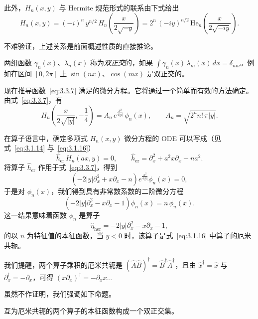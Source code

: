此外，$H_n(x,y)$ 与 Hermite 规范形式的联系由下式给出
\begin{equation}
H_n(x,y)=(-i)^n\,y^{n/2}\,
H_n\!\left(\frac{x}{2\sqrt{-y}}\right)
=2^n\,(-iy)^{n/2}\,
\mathrm{He}_n\!\left(\frac{x}{2\sqrt{-iy}}\right).
\label{eq:3.3.11}
\end{equation}

不难验证，上述关系是前面概述性质的直接推论。

 两组函数 $\gamma_n(x)$、$\lambda_n(x)$ 称为\emph{双正交}的，如果
$\int \gamma_n(x)\,\lambda_m(x)\,dx=\delta_{nm}$。例如在区间 $[0,2\pi]$ 上 $\sin(nx)$、$\cos(mx)$ 是双正交的。

\medskip
现在推导函数~\eqref{eq:3.3.7} 满足的微分方程。它将通过一个简单而有效的方法确定。由式~\eqref{eq:3.3.7}，有
\[
H_n\!\left(\frac{x}{2\sqrt{|y|}},-\frac{1}{4}\right)
=A_n\,e^{\frac{x^2}{4|y|}}\,\phi_n(x),\qquad
A_n=\sqrt{2^n n!\,\pi|y|}.
\]

在算子语言中，确定多项式 $H_n(x,y)$ 微分方程的 ODE 可以写成（见式~\eqref{eq:3.1.14} 与~\eqref{eq:3.1.16}）
\[
\hat h_{\mathrm{er}}\,H_n(ax,y)=0,\qquad
\hat h_{\mathrm{er}}=\partial_x^2+a^2x\partial_x-n a^2.
\]
将算子 $\hat h_{\mathrm{er}}$ 作用于式~\eqref{eq:3.3.7}，得到
\[
\left(-2|y|\partial_x^2+x\partial_x-n\right)e^{\frac{x^2}{4|y|}}\phi_n(x)=0,
\]
于是对 $\phi_n(x)$，我们得到具有非常数系数的二阶微分方程
\begin{equation}
\left(-2|y|\partial_x^2-x\partial_x-1\right)\phi_n(x)=n\,\phi_n(x).
\label{eq:3.3.15}
\end{equation}
这一结果意味着函数 $\phi_n$ 是算子
\begin{equation}
\hat\eta_{\mathrm{her}}=-2|y|\partial_x^2-x\partial_x-1,
\label{eq:3.3.16}
\end{equation}
的以 $n$ 为特征值的本征函数，当 $y<0$ 时，该算子是式~\eqref{eq:3.1.16} 中算子的厄米共轭。

 我们提醒，两个算子乘积的厄米共轭是
$(\hat A\hat B)^\dagger=\hat B^\dagger\hat A^\dagger$，且由 $\hat x^\dagger=\hat x$ 与 $\partial_x^\dagger=-\partial_x$，可得
$(x\partial_x)^\dagger=-\partial_x x\ldots$

\medskip
虽然不作证明，我们强调如下命题。

\begin{proposition}
互为厄米共轭的两个算子的本征函数构成一个双正交集。
\end{proposition}

